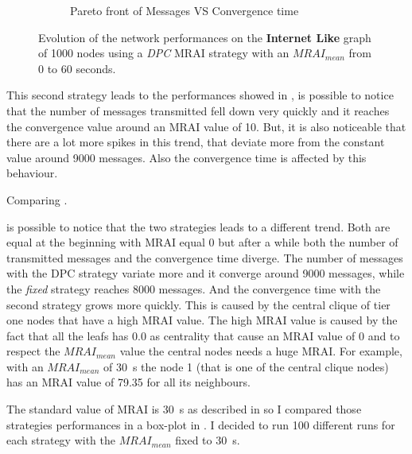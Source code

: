 \begin{figure}[h]
\begin{subfigure}[b]{0.45\textwidth}
		 \caption{Pareto front of Messages VS Convergence time}
         \label{fig:internt_like_1000_DPC_evolution_paretoFront}
     \end{subfigure}
		\caption{Evolution of the network performances on the \textbf{Internet Like} graph 
			of \num{1000} nodes using a \textit{DPC} \ac{MRAI} strategy
			with an $MRAI_{mean}$ from \num{0} to \num{60} seconds.}
        \label{fig:internet_like_1000_dpc_evolution}
\end{figure}

This second strategy leads to the performances showed in ,
is possible to notice that the number of messages transmitted fell down
very quickly and it reaches the convergence value around an \ac{MRAI} value of
\num{10}.
But, it is also noticeable that there are a lot more spikes in this trend, that
deviate more from the constant value around \num{9000} messages.
Also the convergence time is affected by this behaviour.

Comparing .

is possible to notice that the two strategies leads to a different trend.
Both are equal at the beginning with \ac{MRAI} equal \num{0} but after a while
both the number of transmitted messages and the convergence time diverge.
The number of messages with the \ac{DPC} strategy variate more and it converge
around \num{9000} messages, while the \textit{fixed} strategy reaches \num{8000}
messages.
And the convergence time with the second strategy grows more quickly.
This is caused by the central clique of tier one nodes that have a high \ac{MRAI}
value.
The high \ac{MRAI} value is caused by the fact that all the leafs has \num{0.0}
as centrality that cause an \ac{MRAI} value of \num{0} and to respect 
the $MRAI_{mean}$ value the central nodes needs a huge \ac{MRAI}.
For example, with an $MRAI_{mean}$ of \SI{30}{\second} the node \num{1} (that is
one of the central clique nodes) has an \ac{MRAI} value of \num{79.35} for all its
neighbours.


The standard value of \ac{MRAI} is \SI{30}{\second} as described in
\cite{rfc4271} so I compared those strategies performances in a box-plot in 
.
I decided to run \num{100} different runs for each strategy with the $MRAI_{mean}$
fixed to \SI{30}{\second}.


